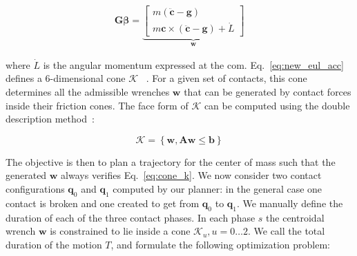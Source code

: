 \documentclass[journal]{IEEEtran}
\newcommand{\mat}[1]{\ensuremath{\begin{bmatrix}#1\end{bmatrix}}}	%
\begin{document}
\begin{align} \label{eq:new_eul_acc}
\mathbf{G} \bm{\beta} = 
\underbrace{\mat{m (\mathbf{\ddot{c}} - \mathbf{g}) \\m \mathbf{c} \times (\mathbf{\ddot{c}} - \mathbf{g}) + \dot{L}}}_{\mathbf{w}}
\end{align}

\noindent where $\dot{L}$ is the angular momentum expressed at the com.
Eq.~\ref{eq:new_eul_acc} defines a 6-dimensional cone $\mathcal{K}$ ~\citep{qiu:dhm:2011,Caron2015}. For a given set of contacts,
this cone determines all the admissible wrenches $\mathbf{w}$ that can be generated by contact forces inside their friction cones.
The face form of $\mathcal{K}$ can be computed using the double description method~\citep{Fukuda1996}:

\begin{equation}
\label{eq:cone_k}
	\mathcal{K} =  \left\{ \mathbf{w}, \mathbf{A}\mathbf{w} \leq \mathbf{b	} \right\}
\end{equation}

The objective 
is then to plan a trajectory for the center of mass such that the generated $\mathbf{w}$ always verifies Eq.~\ref{eq:cone_k}. 
We now consider two contact configurations  $\mathbf{q}_0$ and $\mathbf{q}_1$ computed by our planner: in the general case one contact is broken and one created to get from
$\mathbf{q}_0$ to $\mathbf{q}_1$. We manually define the duration of each of the three contact phases.
In each phase $s$ the centroidal wrench $\mathbf{w}$ is constrained to lie inside a cone $\mathcal{K}_u, u =0 \dots 2$.
We call the total duration of the motion $T$, and formulate the following optimization problem:
\end{document}
